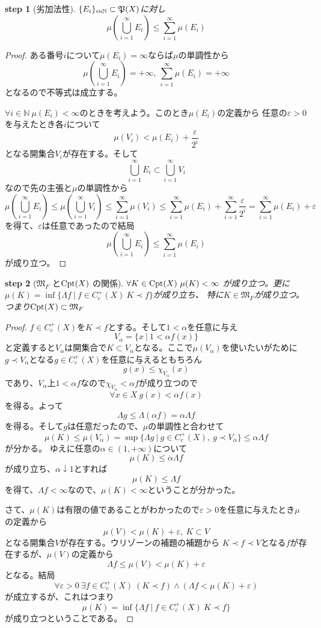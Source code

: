 \documentclass[leqno]{jsarticle}
\newtheorem{stp}{{\bf step}}
\newcommand{\nn}{\mathbb{N}}
\newcommand{\mgn}{\infty}
\newcommand{\mf}{\mathfrak{M}_F}
\newcommand{\pw}{\mathfrak{P}(X)}
\newcommand{\la}{\Lambda}
\newcommand{\ep}{\varepsilon}
\newcommand{\cpt}{{\rm Cpt}(X)}
\newcommand{\praf}{C_c^{+}(X)}
\newcommand{\al}{\alpha}
\begin{document}
\begin{stp}[劣加法性]\label{1}$\{E_i\}_{i\\n\nn}\subset \pw$に対し
\[
\mu(\bigcup_{i=1}^{\mgn}E_i)\le\sum_{i=1}^{\mgn}\mu(E_i)
\]
\end{stp}
\begin{proof}ある番号$i$について$\mu(E_i)=\mgn$ならば$\mu$の単調性から
\[
\mu(\bigcup_{i=1}^{\mgn}E_i)=+\mgn,\ \sum_{i=1}^{\mgn}\mu(E_i)=+\mgn
\]
となるので不等式は成立する。\par
$\forall i\in \nn \ \mu(E_i)<\mgn$のときを考えよう。このとき$\mu(E_i)$の定義から
任意の$\ep>0$を与えたとき各$i$について
\[
\mu(V_i)<\mu(E_i)+\frac{\ep}{2^i}
\]
となる開集合$V_i$が存在する。そして
\[
\bigcup_{i=1}^{\mgn}E_i\subset\bigcup_{i=1}^{\mgn}V_i
\]
なので先の主張と$\mu$の単調性から
\[
\mu(\bigcup_{i=1}^{\mgn}E_i)\le \mu(\bigcup_{i=1}^{\mgn}V_i)\le
 \sum_{i=1}^{\mgn}\mu(V_i)\le \sum_{i=1}^{\mgn}\mu(E_{i})+\sum_{i=1}^{\mgn}\frac{\ep}{2^i}
=\sum_{i=1}^{\mgn}\mu(E_{i})+\ep
\]を得て、$\ep$は任意であったので結局
\[
\mu(\bigcup_{i=1}^{\mgn}E_i)\le\sum_{i=1}^{\mgn}\mu(E_i)
\]
が成り立つ。
\end{proof}


\begin{stp}[$\mf$ と$\cpt$ の関係]\label{2}
$\forall K\in \cpt\ \mu(K)<\mgn$ が成り立つ。更に$\mu(K)=\inf\{\la f\ |\ f\in\praf\ K\prec f\}$が成り立ち、
特に$K\in \mf$が成り立つ。つまり$\cpt\subset \mf$
\end{stp}
\begin{proof}
$f\in \praf$を$K\prec f$とする。そして$1<\al$を任意に与え
\[
V_{\al}=\{x\ |\ 1<\al f(x)\}
\]
と定義すると$V_{\al}$は開集合で$K\subset V_{\al}$となる。ここで$\mu(V_{\al})$を使いたいがために$g\prec V_{\al}$となる$g\in \praf$を任意に与えるともちろん
\[
g(x)\le\chi_{V_{\al}}(x)
\]
であり、$V_{\al}$上$1<\al f$なので$\chi_{V_{\al}}< \al f$が成り立つので
\[
\forall x\in X\ g(x)<\al f(x)
\]
を得る。よって
\[
\la g\le \la (\al f)=\al \la f
\]を得る。そして$g$は任意だったので、$\mu$の単調性と合わせて
\[
\mu(K)\le \mu(V_{\al})=\sup\{\la g\ |\ g\in \praf,\ g\prec V_{\al}\}\le \al \la f
\]
が分かる。
ゆえに任意の$\al\in (1,+\mgn)$について
\[
\mu(K)\le \al \la f
\]
が成り立ち、$\al \downarrow 1$とすれば
\[
\mu(K)\le \la f
\]
を得て、$\la f<\mgn$なので、$\mu(K)<\mgn$ということが分かった。\par
さて、$\mu(K)$は有限の値であることがわかったので$\ep>0$を任意に与えたとき$\mu$の定義から
\[
\mu(V)<\mu(K)+\ep,\ K\subset V
\]
となる開集合$V$が存在する。ウリゾーンの補題の補題から
$K\prec f\prec V$となる$f$が存在するが、$\mu(V)$の定義から
\[
\la f\le \mu(V)<\mu(K)+\ep
\]
となる。結局
\[
\forall \ep >0 \ \exists f\in \praf\ (K\prec f )\land (\la f<\mu(K)+\ep)  
\]
が成立するが、これはつまり
\[
\mu(K)=\inf\{\la f\ |\ f\in\praf\ K\prec f\}
\]
が成り立つということである。
\end{proof}
\end{document}
